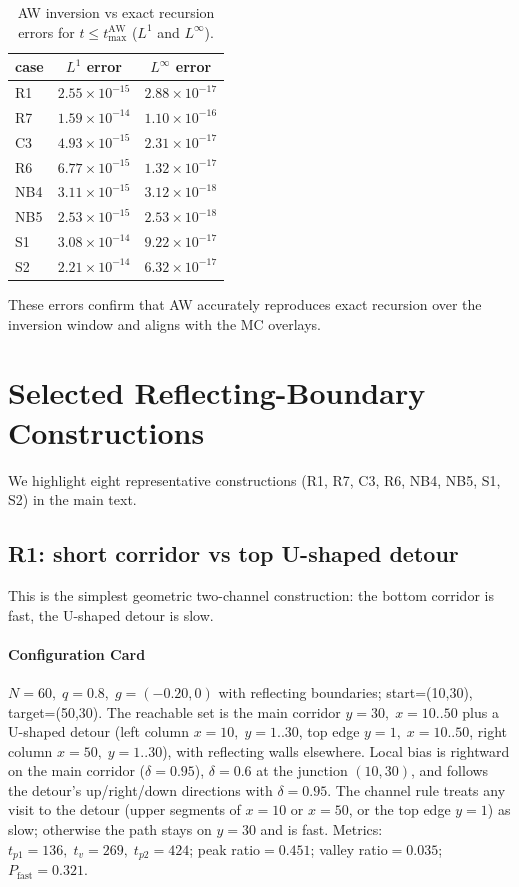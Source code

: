 \documentclass[11pt]{article}
\begin{document}
\begin{table}[!htbp]
  \centering
  \begin{tabular}{lcc}
    \toprule
    case & $L^1$ error & $L^\infty$ error \\
    \midrule
    R1 & $2.55\times 10^{-15}$ & $2.88\times 10^{-17}$ \\
    R7 & $1.59\times 10^{-14}$ & $1.10\times 10^{-16}$ \\
    C3 & $4.93\times 10^{-15}$ & $2.31\times 10^{-17}$ \\
    R6 & $6.77\times 10^{-15}$ & $1.32\times 10^{-17}$ \\
    NB4 & $3.11\times 10^{-15}$ & $3.12\times 10^{-18}$ \\
    NB5 & $2.53\times 10^{-15}$ & $2.53\times 10^{-18}$ \\
    S1 & $3.08\times 10^{-14}$ & $9.22\times 10^{-17}$ \\
    S2 & $2.21\times 10^{-14}$ & $6.32\times 10^{-17}$ \\
    \bottomrule
  \end{tabular}
  \caption{AW inversion vs exact recursion errors for $t\le t_{\max}^{\mathrm{AW}}$ ($L^1$ and $L^\infty$).}
  \label{tab:aw-errors}
\end{table}
\noindent These errors confirm that AW accurately reproduces exact recursion over the inversion window and aligns with the MC overlays.

\section{Selected Reflecting-Boundary Constructions}
We highlight eight representative constructions (R1, R7, C3, R6, NB4, NB5, S1, S2) in the main text.

\subsection{R1: short corridor vs top U-shaped detour}
This is the simplest geometric two-channel construction: the bottom corridor is fast, the U-shaped detour is slow.

\paragraph{Configuration Card}
$N=60,\;q=0.8,\;g=(-0.20,0)$ with reflecting boundaries; start=(10,30), target=(50,30). The reachable set is the main corridor $y=30,\;x=10..50$ plus a U-shaped detour (left column $x=10,\;y=1..30$, top edge $y=1,\;x=10..50$, right column $x=50,\;y=1..30$), with reflecting walls elsewhere. Local bias is rightward on the main corridor ($\delta=0.95$), $\delta=0.6$ at the junction $(10,30)$, and follows the detour’s up/right/down directions with $\delta=0.95$. The channel rule treats any visit to the detour (upper segments of $x=10$ or $x=50$, or the top edge $y=1$) as slow; otherwise the path stays on $y=30$ and is fast. Metrics: $t_{p1}=136,\;t_v=269,\;t_{p2}=424$; peak ratio$=0.451$; valley ratio$=0.035$; $P_{\text{fast}}=0.321$.
\end{document}
